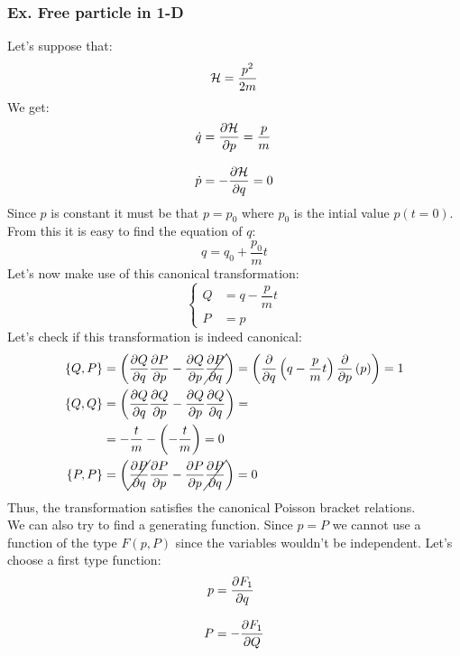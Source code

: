 \subsubsection{Ex. Free particle in 1-D}
Let's suppose that:
\begin{equation}
  \mathcal{H} = \dfrac{p^2}{2m}
\end{equation}
We get:
\begin{equation}
  \begin{split}
    \dot{q} &= \pdv{\hamfun}{p} = \dfrac{p}{m}\\[8pt]
    \dot{p} &= -\pdv{\hamfun}{q} = 0
  \end{split}
\end{equation}
Since $p$ is constant it must be that $p = p_0$ where $p_0$ is the intial value $p(t=0)$. From this it is easy to find the equation of $q$:
\begin{equation}
  q = q_0 + \dfrac{p_0}{m}t
\end{equation}
Let's now make use of this canonical transformation:
\begin{equation}
  \begin{cases}
    Q &= q - \dfrac{p}{m}t\\[8pt]
    P &= p
  \end{cases}
\end{equation}
Let's check if this transformation is indeed canonical:
\begin{equation}
  \begin{split}
    \pb{Q}{P} &= \brackets{\pdv{Q}{q}\pdv{P}{p} - \pdv{Q}{p}\cancel{\pdv{P}{q}}} = \brackets{\pdv{}{q}\brackets{q - \dfrac{p}{m}t}\pdv{}{p}\brackets{p}}= 1\\
    \pb{Q}{Q} &= \brackets{\pdv{Q}{q}\pdv{Q}{p} - \pdv{Q}{p}\pdv{Q}{q}} = \\
    &= -\dfrac{t}{m} - \brackets{-\dfrac{t}{m}} = 0\\
    \pb{P}{P} &= \brackets{\cancel{\pdv{P}{q}}\pdv{P}{p} - \pdv{P}{p}\cancel{\pdv{P}{q}}} = 0
  \end{split}
\end{equation}
Thus, the transformation satisfies the canonical Poisson bracket relations.\\
We can also try to find a generating function. Since $p = P$ we cannot use a function of the type $F(p,P)$ since the variables wouldn't be independent. Let's choose a first type function:
\begin{equation}
  \begin{split}
    p &= \pdv{F_1}{q}\\[8pt]
    P &= -\pdv{F_1}{Q}
  \end{split}
\end{equation}
